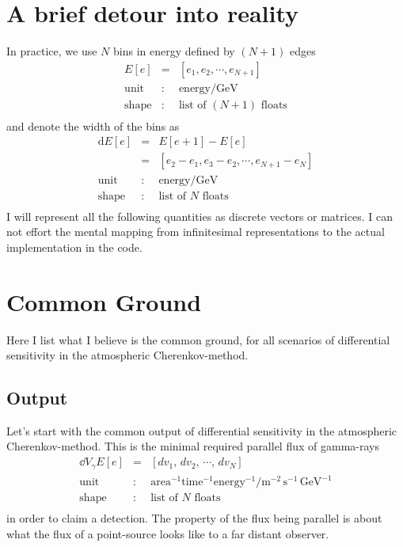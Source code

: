 \documentclass{article}%
\begin{document}
    \section{A brief detour into reality}
        In practice, we use $N$ bins in energy defined by $(N+1)$ edges
        \begin{eqnarray*}
            E[e] &=& [e_1, e_2, \cdots, e_{N+1}]\\
            \text{unit} &:& \text{energy} / \text{GeV}\\
            \text{shape} &:& \text{list of}\,\,(N + 1)\,\,\text{floats}\\
        \end{eqnarray*}
        and denote the width of the bins as
        \begin{eqnarray*}
            \text{d}E[e] &=& E[e+1] - E[e]\\
            &=& [e_2-e_1, e_3-e_2, \cdots, e_{N+1}-e_N]\\
            \text{unit} &:& \text{energy} / \text{GeV}\\
            \text{shape} &:& \text{list of}\,\,N\,\,\text{floats}\\
        \end{eqnarray*}
        I will represent all the following quantities as discrete vectors or matrices.
        I can not effort the mental mapping from infinitesimal representations to the actual implementation in the code.
    \section{Common Ground}
        \label{SecCommonGround}
        Here I list what I believe is the common ground, for all scenarios of differential sensitivity in the atmospheric Cherenkov-method.
        \subsection{Output}
            Let's start with the common output of differential sensitivity in the atmospheric Cherenkov-method.
            This is the minimal required parallel flux of gamma-rays
            \begin{eqnarray*}
                \dd{V_\gamma}{E}[e] &=& [dv_1, \, dv_2, \, \cdots, \, dv_N]\\
                \text{unit} &:& \text{area}^{-1} \text{time}^{-1} \text{energy}^{-1} / \text{m}^{-2}\,\text{s}^{-1}\,\text{GeV}^{-1}\\
                \text{shape} &:& \text{list of}\,\,N\,\,\text{floats}\\
            \end{eqnarray*}
            in order to claim a detection.
            The property of the flux being parallel is about what the flux of a point-source looks like to a far distant observer.
\end{document}
